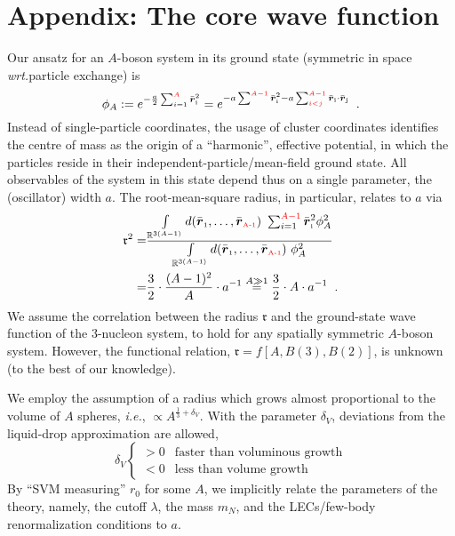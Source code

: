 \documentclass
[aps,nofootinbib,prl,showpacs,twocolumn,groupedaddress,superscriptaddress]
{revtex4}
\newcommand{\red}[1]{\textcolor{red}{#1}}
\newcommand{\la}{\label}
\newcommand{\be}{\begin{equation}}
\newcommand{\ee}{\end{equation}}
\newcommand{\vcl}[1]{\ensuremath{\bar{\boldsymbol{r}}_\text{\tiny #1}}}
\newcommand{\ie}{\textit{i.e.}\;}
\newcommand{\wrt}{\textit{wrt.}\;}
\begin{document}
\section{Appendix: The core wave function}
Our ansatz for an $A$-boson system in its ground state
(symmetric in space \wrt particle exchange) is
\be
\phi_A:=e^{-\frac{a}{2}\sum_{i=1}^{\red{A}}\vcl{i}^2}=e^{-a\sum^{\red{A-1}}\vcl{i}^2-a\sum^{\red{A-1}}_{\red{i<j}}\vcl{i}\cdot\vcl{j}}\la{eq.wfktphi}\;\;.
\ee
Instead of single-particle coordinates, the usage of cluster coordinates identifies
the centre of mass as the origin of a ``harmonic'', effective potential, in which the
particles reside in their independent-particle/mean-field ground state. All observables
of the system in this state depend thus on a single
parameter, the (oscillator) width $a$. The root-mean-square radius, in particular, relates to
$a$ via
\begin{align}
\mathfrak{r}^2=&\frac{\int\limits_{\mathbb{R}^{3(A-1)}}d(\vcl{1},\ldots,\vcl{\red{A-1}})~
\sum_{i=1}^{\red{A-1}}\vcl{i}^2\phi_A^2}
{\int\limits_{\mathbb{R}^{3(A-1)}}d(\vcl{1},\ldots,\vcl{\red{A-1}})~\phi_A^2}\\
=&\frac{3}{2}\cdot\frac{(A-1)^2}{A}\cdot a^{-1}\stackrel{A\gg 1}{=}
\frac{3}{2}\cdot A\cdot a^{-1}\;\;.
\end{align}
We assume the correlation between the radius $\mathfrak{r}$ and the ground-state wave function of the
$3$-nucleon system, to hold for any spatially symmetric $A$-boson system. However, the functional
relation, $\mathfrak{r}=f\left[A,B(3),B(2)\right]$, is unknown (to the best of our knowledge).

We employ the assumption of a radius which grows almost proportional to the volume of
$A$ spheres, \ie, $\propto A^{\frac{1}{3}+\delta_V}$.
With the parameter $\delta_V$, deviations from the liquid-drop approximation are allowed,
$$
\delta_V\left\lbrace
\begin{array}{cl} >0 & \text{faster than voluminous growth}\\ 
                 <0 & \text{less than volume growth}
\end{array}\right.
$$
By ``SVM measuring'' $r_0$ for some $A$, we
implicitly relate the parameters of the theory, namely, the cutoff $\lambda$, the mass $m_N$, and
the LECs/few-body renormalization conditions to $a$.

\newpage
\end{document}

